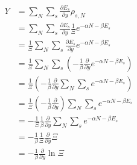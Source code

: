 \begin{equation}
    \begin{aligned}
        Y&=\sum_N{\sum_s{\frac{\partial E_s}{\partial y}\rho _{s,N}}}
\\
&=\sum_N{\sum_s{\frac{\partial E_s}{\partial y}\frac{1}{\varXi}e^{-\alpha N-\beta E_s}}}
\\
&=\frac{1}{\varXi}\sum_N{\sum_s{\frac{\partial E_s}{\partial y}e^{-\alpha N-\beta E_s}}}
\\
&=\frac{1}{\varXi}\sum_N{\sum_s{\left( -\frac{1}{\beta}\frac{\partial}{\partial y}e^{-\alpha N-\beta E_s} \right)}}
\\
&=\frac{1}{\varXi}\left( -\frac{1}{\beta}\frac{\partial}{\partial y}\sum_N{\sum_s{e^{-\alpha N-\beta E_s}}} \right) 
\\
&=\frac{1}{\varXi}\left( -\frac{1}{\beta}\frac{\partial}{\partial y} \right) \sum_N{\sum_s{e^{-\alpha N-\beta E_s}}}
\\
&=-\frac{1}{\varXi}\frac{1}{\beta}\frac{\partial}{\partial y}\sum_N{\sum_s{e^{-\alpha N-\beta E_s}}}
\\
&=-\frac{1}{\beta}\frac{1}{\varXi}\frac{\partial}{\partial y}\varXi 
\\
&=-\frac{1}{\beta}\frac{\partial}{\partial y}\ln \varXi 
    \end{aligned}
\end{equation}


